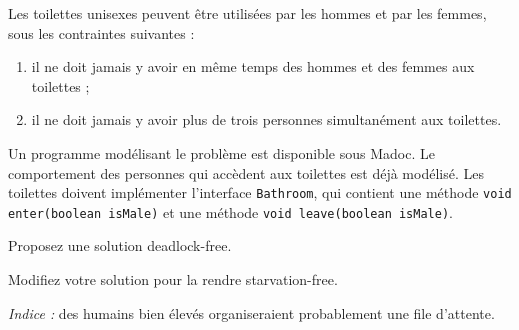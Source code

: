 
\begingroup

\begin{exercice}
  \label{exo:monitors/unisex}
    
  Les toilettes unisexes peuvent être utilisées par les hommes et par les femmes, sous les contraintes suivantes :
  \begin{enumerate}
  \item il ne doit jamais y avoir en même temps des hommes et des femmes aux toilettes ;
  \item il ne doit jamais y avoir plus de trois personnes simultanément aux toilettes.
  \end{enumerate}
  
  Un programme modélisant le problème est disponible sous Madoc. Le comportement des personnes qui
  accèdent aux toilettes est déjà modélisé. Les toilettes doivent implémenter l'interface
  \lstinline{Bathroom}, qui contient une méthode \lstinline{void enter(boolean isMale)} et une méthode \lstinline{void leave(boolean isMale)}. 
  
  \begin{questions}
  \item Proposez une solution deadlock-free.
  \item Modifiez votre solution pour la rendre starvation-free.
  \end{questions}

  \emph{Indice :} des humains bien élevés organiseraient probablement une file d'attente.  

\end{exercice}

\endgroup
\endinput
